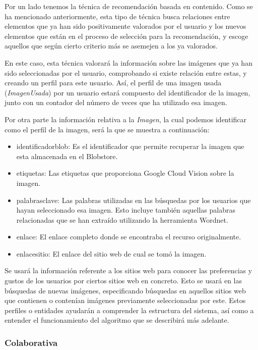 Por un lado tenemos la técnica de recomendación basada en contenido. Como se ha mencionado anteriormente, esta tipo de técnica busca relaciones entre elementos que ya han sido positivamente valorados por el usuario y los nuevos elementos que están en el proceso de selección para la recomendación, y escoge aquellos que según cierto criterio más se asemejen a los ya valorados.

En este caso, esta técnica valorará la información sobre las imágenes que ya han sido seleccionadas por el usuario, comprobando si existe relación entre estas, y creando un perfil para este usuario. Así, el perfil de una imagen usada (\textit{ImagenUsada}) por un usuario estará compuesto del identificador de la imagen, junto con un contador del número de veces que ha utilizado esa imagen. 

Por otra parte la información relativa a la \textit{Imagen}, la cual podemos identificar como el perfil de la imagen, será la que se muestra a continuación:

\begin{itemize}
\item identificador\textunderscore blob: Es el identificador que permite recuperar la imagen que esta almacenada en el Blobstore.
\item etiquetas: Las etiquetas que proporciona Google Cloud Vision sobre la imagen.
\item palabras\textunderscore clave: Las palabras utilizadas en las búsquedas por los usuarios que hayan seleccionado esa imagen. Esto incluye también aquellas palabras relacionadas que se han extraído utilizando la herramienta Wordnet.
\item enlace: El enlace completo donde se encontraba el recurso originalmente.
\item enlace\textunderscore sitio: El enlace del sitio web de cual se tomó la imagen.
\end{itemize}

Se usará la información referente a los sitios web para conocer las preferencias y gustos de los usuarios por ciertos sitios web en concreto. Esto se usará en las búsquedas de nuevas imágenes, especificando búsquedas en aquellos sitios web que contienen o contenían imágenes previamente seleccionadas por este. Estos perfiles o entidades ayudarán a comprender la estructura del sistema, así como a entender el funcionamiento del algoritmo que se describirá más adelante.\\

\subsubsection{Colaborativa}


